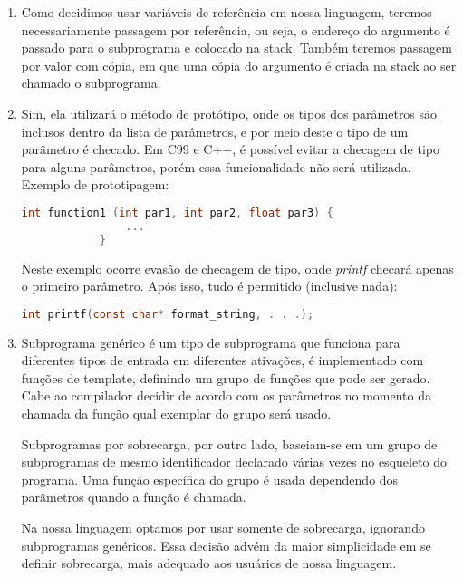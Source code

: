 \documentclass[12pt, a4paper]{article}
\begin{document}
\begin{enumerate}
        \item
        Como decidimos usar variáveis de referência em nossa linguagem, teremos
        necessariamente passagem por referência, ou seja, o endereço do
        argumento é passado para o subprograma e colocado na stack. Também
        teremos passagem por valor com cópia, em que uma cópia do argumento é
        criada na stack ao ser chamado o subprograma.

        \item
        Sim, ela utilizará o método de protótipo, onde os tipos dos parâmetros são inclusos dentro da lista de parâmetros, e por meio deste o tipo de um parâmetro é checado. Em C99 e C++, é possível evitar a checagem de tipo para alguns parâmetros, porém essa funcionalidade não será utilizada.
        Exemplo de prototipagem:
        \begin{lstlisting}[language=C]
            int function1 (int par1, int par2, float par3) {
            	...
            }
        \end{lstlisting}
        Neste exemplo ocorre evasão de checagem de tipo, onde \emph{printf} checará apenas o primeiro parâmetro. Após isso, tudo é permitido (inclusive nada):
        \begin{lstlisting}[language=C]
            int printf(const char* format_string, . . .);
        \end{lstlisting}
        
        \item
        Subprograma genérico é um tipo de subprograma que funciona para
        diferentes tipos de entrada em diferentes ativações, é implementado com
        funções de template,  definindo um grupo de funções que pode ser
        gerado. Cabe ao compilador decidir de acordo com os parâmetros no
        momento da chamada da função qual exemplar do grupo será usado.

        Subprogramas por sobrecarga, por outro lado, baseiam-se em um grupo de
        subprogramas de mesmo identificador declarado várias vezes no esqueleto
        do programa. Uma função específica do grupo é usada dependendo dos
        parâmetros quando a função é chamada.

        Na nossa linguagem optamos por usar somente de sobrecarga, ignorando
        subprogramas genéricos. Essa decisão advém da maior simplicidade em se
        definir sobrecarga, mais adequado aos usuários de nossa linguagem.

        \begin{comment}
            Com sobrecarga:
            int soma(int a, int b) {
                return a+b;
            }


\end{comment}
\end{enumerate}
\end{document}
